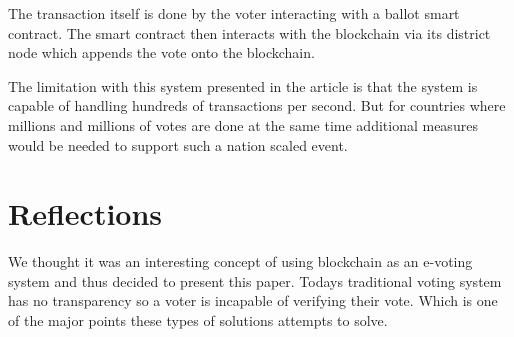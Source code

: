 The transaction itself is done by the voter interacting with a ballot smart contract.
The smart contract then interacts with the blockchain via its district node which
appends the vote onto the blockchain.

The limitation with this system presented in the article is that the system is
capable of handling hundreds of transactions per second. But for countries where
millions and millions of votes are done at the same time additional measures would
be needed to support such a nation scaled event.

\section{Reflections}\label{sec:reflections}
We thought it was an interesting concept of using blockchain as an e-voting system
and thus decided to present this paper. Todays traditional voting system has no transparency
so a voter is incapable of verifying their vote. Which is one of the major points these types
of solutions attempts to solve.
